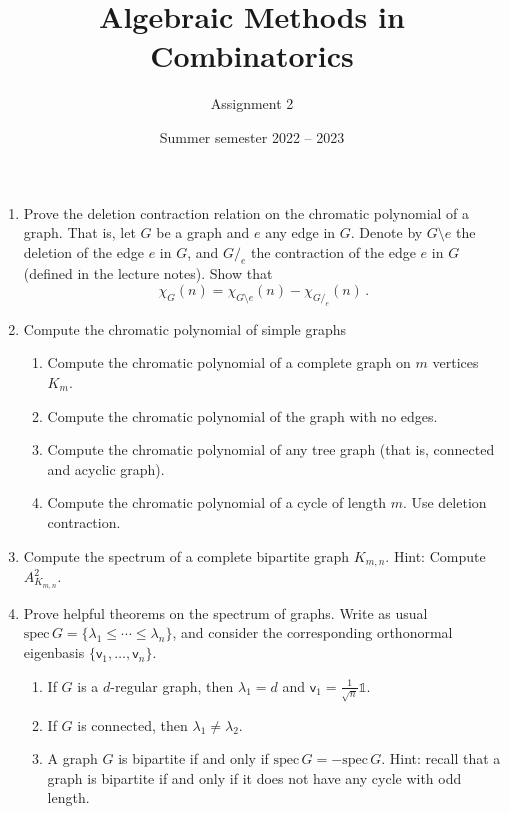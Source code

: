 \documentclass[kulak]{tplt}
\title{Algebraic Methods in Combinatorics}
\author{Assignment 2}
\date{Summer semester 2022 -- 2023}
\theoremstyle{definition}
\newcommand{\vv}{\mathsf{v}}
\newcommand{\spec}{\mathrm{spec}}
\begin{document}
\maketitle
\begin{enumerate}
\item Prove the deletion contraction relation on the chromatic polynomial of a graph.
That is, let $G$ be a graph and $e$ any edge in $G$.
Denote by $G\setminus e $ the deletion of the edge $e$ in $G$, and $G /_e$ the contraction of the edge $e$ in $G$ (defined in the lecture notes).
Show that
$$ \chi_G(n) = \chi_{G\setminus e}(n) - \chi_{G /_e}(n)\, . $$

\item Compute the chromatic polynomial of simple graphs

\begin{enumerate}
\item Compute the chromatic polynomial of a complete graph on $m$ vertices $K_m$.

\item Compute the chromatic polynomial of the graph with no edges.

\item Compute the chromatic polynomial of any tree graph (that is, connected and acyclic graph).

\item Compute the chromatic polynomial of a cycle of length $m$.
Use deletion contraction.
\end{enumerate}



\item Compute the spectrum of a complete bipartite graph $K_{m, n}$.
Hint: Compute $A_{K_{m, n}}^2$.



\item Prove helpful theorems on the spectrum of graphs.
Write as usual $\spec \, G = \{\lambda_1 \leq \cdots \leq \lambda_n \}$, and consider the corresponding orthonormal eigenbasis $\{\vv_1, \ldots, \vv_n\}$.


\begin{enumerate}
\item If $G$ is a $d$-regular graph, then $\lambda_1 = d$ and $\vv_1 = \frac{1}{\sqrt{n}}\mathbb{1}$.

\item If $G$ is connected, then $\lambda_1 \neq \lambda_2$.

\item A graph $G$ is bipartite if and only if $\spec \, G = - \spec \, G$.
Hint: recall that a graph is bipartite if and only if it does not have any cycle with odd length.


\end{enumerate}
\end{enumerate}
\end{document}
